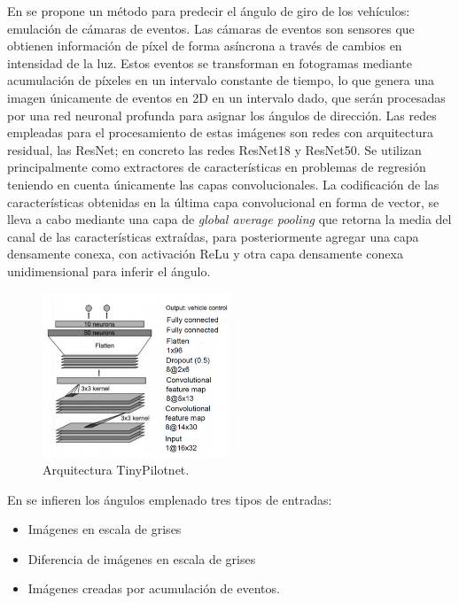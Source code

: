 En \cite{event} se propone un método para predecir el ángulo de giro de los vehículos: emulación de cámaras de eventos. Las cámaras de eventos son sensores que obtienen información de píxel de forma asíncrona a través de cambios en intensidad de la luz. Estos eventos se transforman en fotogramas mediante acumulación de píxeles en un intervalo constante de tiempo, lo que genera una imagen únicamente de eventos en 2D en un intervalo dado, que serán procesadas por una red neuronal profunda para asignar los ángulos de dirección. Las redes empleadas para el procesamiento de estas imágenes son redes con arquitectura residual, las ResNet; en concreto las redes ResNet18 y ResNet50. Se utilizan principalmente como extractores de características en problemas de regresión teniendo en cuenta únicamente las capas convolucionales. La codificación de las características obtenidas en la última capa convolucional en forma de vector, se lleva a cabo mediante una capa de \textit{global average pooling} que retorna la media del canal de las características extraídas, para posteriormente agregar una capa densamente conexa, con activación ReLu y otra capa densamente conexa unidimensional para inferir el ángulo.

\begin{figure}
\begin{center}
	\includegraphics[width=0.5\textwidth]{img/tinypilotnet.png}
   \caption{Arquitectura TinyPilotnet.}
	\label{fig.tinypilotnet}
\end{center}
\end{figure}

\noindent En \cite{event} se infieren los ángulos emplenado tres tipos de entradas:

\begin{itemize}
    \item Imágenes en escala de grises
    \item Diferencia de imágenes en escala de grises
    \item Imágenes creadas por acumulación de eventos.
\end{itemize}

